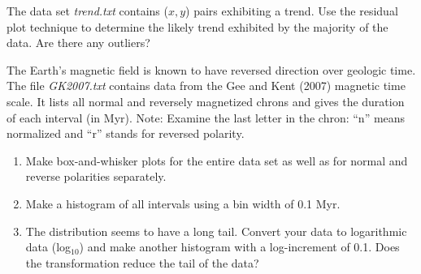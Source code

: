 \begin{problem}
The data set \emph{trend.txt} contains ($x,y$) pairs exhibiting a trend.  Use the residual plot technique
to determine the likely trend exhibited by the majority of the data.  Are there any outliers?
\end{problem}

\begin{problem}
The Earth's magnetic field is known to have reversed direction over geologic time.  The file \emph{GK2007.txt} contains data from the
Gee and Kent (2007) magnetic time scale. It lists all normal and reversely magnetized chrons and gives the duration
of each interval (in Myr). Note: Examine the last letter in the chron: ``n'' means normalized and ``r'' stands for reversed polarity.
\begin{enumerate}[label=\alph*)]
	\item Make box-and-whisker plots for the entire data set as well as for normal and reverse polarities separately.
	\item Make a histogram of all intervals using a bin width of 0.1 Myr.
	\item The distribution seems to have a long tail.  Convert your data to logarithmic data (log$_{10}$) and
	make another histogram with a log-increment of 0.1.  Does the transformation reduce the tail of the data?
\end{enumerate}
\end{problem}
